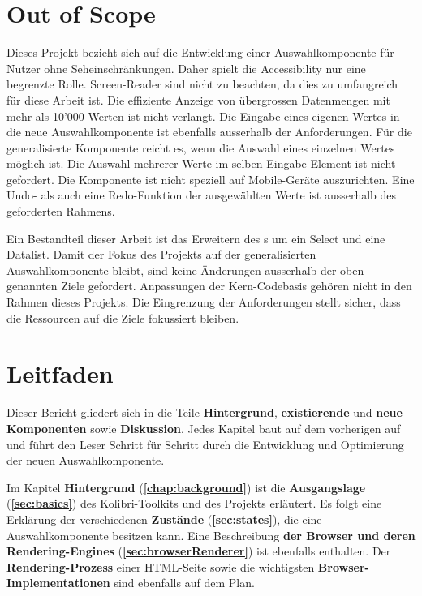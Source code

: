 \section{Out of Scope}
\label{sec:outOfScope}

Dieses Projekt bezieht sich auf die Entwicklung einer Auswahlkomponente für Nutzer ohne Seheinschränkungen.
Daher spielt die Accessibility nur eine begrenzte Rolle.
Screen-Reader sind nicht zu beachten, da dies zu umfangreich für diese Arbeit ist.
Die effiziente Anzeige von übergrossen Datenmengen mit mehr als 10'000 Werten ist nicht verlangt.
Die Eingabe eines eigenen Wertes in die neue Auswahlkomponente ist ebenfalls ausserhalb der Anforderungen.
Für die generalisierte Komponente reicht es, wenn die Auswahl eines einzelnen Wertes möglich ist.
Die Auswahl mehrerer Werte im selben Eingabe-Element ist nicht gefordert.
Die Komponente ist nicht speziell auf Mobile-Geräte auszurichten. 
Eine Undo- als auch eine Redo-Funktion der ausgewählten Werte ist ausserhalb des geforderten Rahmens. 

Ein Bestandteil dieser Arbeit ist das Erweitern des s um ein Select und eine Datalist.
Damit der Fokus des Projekts auf der generalisierten Auswahlkomponente bleibt, sind keine Änderungen ausserhalb der oben genannten Ziele gefordert.
Anpassungen der Kern-Codebasis gehören nicht in den Rahmen dieses Projekts.
Die Eingrenzung der Anforderungen stellt sicher, dass die Ressourcen auf die Ziele fokussiert bleiben.


\section{Leitfaden}
\label{sec:tocTexted}

Dieser Bericht gliedert sich in die Teile \textbf{Hintergrund}, \textbf{existierende} und \textbf{neue Komponenten} sowie \textbf{Diskussion}.
Jedes Kapitel baut auf dem vorherigen auf und führt den Leser Schritt für Schritt durch die Entwicklung und Optimierung der neuen Auswahlkomponente.

Im Kapitel \textbf{Hintergrund} (\textbf{\ref{chap:background}}) ist die \textbf{Ausgangslage} (\textbf{\ref{sec:basics}}) des Kolibri-Toolkits und des Projekts erläutert.
Es folgt eine Erklärung der verschiedenen \textbf{Zustände} (\textbf{\ref{sec:states}}), die eine Auswahlkomponente besitzen kann. 
Eine Beschreibung \textbf{der Browser und deren Rendering-Engines} (\textbf{\ref{sec:browserRenderer}}) ist ebenfalls enthalten.
Der \textbf{Rendering-Prozess} einer HTML-Seite sowie die wichtigsten \textbf{Browser-Implementationen} sind ebenfalls auf dem Plan.


